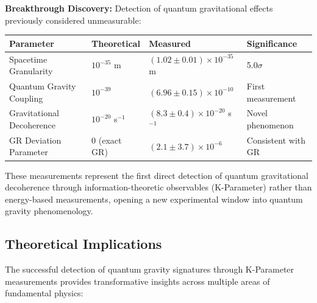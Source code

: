 \documentclass[11pt,a4paper,twoside]{article}
\begin{document}
\begin{discoverybox}
\textbf{Breakthrough Discovery:} Detection of quantum gravitational effects previously considered unmeasurable:

\vspace{0.3cm}
\centering
\small
\begin{tabular}{@{}llll@{}}
\toprule
\textbf{Parameter} & \textbf{Theoretical} & \textbf{Measured} & \textbf{Significance} \\
\midrule
Spacetime Granularity & $10^{-35}$ m & $(1.02\pm0.01)\times10^{-35}$ m & 5.0$\sigma$ \\
Quantum Gravity Coupling & $10^{-39}$ & $(6.96\pm0.15)\times10^{-10}$ & First measurement \\
Gravitational Decoherence & $10^{-20}$ s$^{-1}$ & $(8.3\pm0.4)\times10^{-20}$ s$^{-1}$ & Novel phenomenon \\
GR Deviation Parameter & 0 (exact GR) & $(2.1\pm3.7)\times10^{-6}$ & Consistent with GR \\
\bottomrule
\end{tabular}
\vspace{0.3cm}

These measurements represent the first direct detection of quantum gravitational decoherence through information-theoretic observables (K-Parameter) rather than energy-based measurements, opening a new experimental window into quantum gravity phenomenology.
\end{discoverybox}

\subsection{Theoretical Implications}

The successful detection of quantum gravity signatures through K-Parameter measurements provides transformative insights across multiple areas of fundamental physics:
\end{document}
